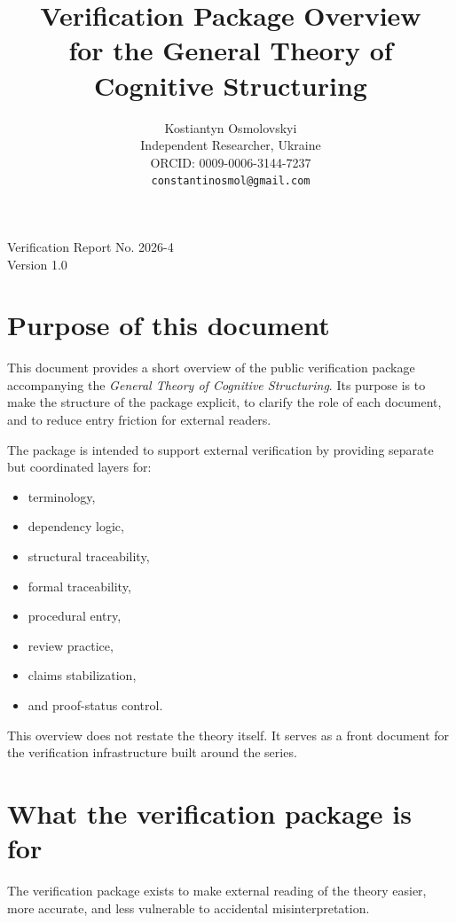 \documentclass[12pt]{article}
\title{Verification Package Overview\\
	\small for the General Theory of Cognitive Structuring}
\author{
	Kostiantyn Osmolovskyi\\
	\small Independent Researcher, Ukraine\\
	\small ORCID: 0009-0006-3144-7237\\
	\small \texttt{constantinosmol@gmail.com}
}
\date{}
\begin{document}
	\maketitle

\begin{center}
	\small
	Verification Report No. 2026-4\\
	Version 1.0
\end{center}

\vspace{0.5em}
	
	\section{Purpose of this document}
	
	This document provides a short overview of the public verification package accompanying the
	\emph{General Theory of Cognitive Structuring}. Its purpose is to make the structure of the
	package explicit, to clarify the role of each document, and to reduce entry friction for
	external readers.
	
	The package is intended to support external verification by providing separate but coordinated
	layers for:
	\begin{itemize}[leftmargin=2em]
		\item terminology,
		\item dependency logic,
		\item structural traceability,
		\item formal traceability,
		\item procedural entry,
		\item review practice,
		\item claims stabilization,
		\item and proof-status control.
	\end{itemize}
	
	This overview does not restate the theory itself. It serves as a front document for the
	verification infrastructure built around the series.
	
	\section{What the verification package is for}
	
	The verification package exists to make external reading of the theory easier, more accurate,
	and less vulnerable to accidental misinterpretation.
	
\end{document}
